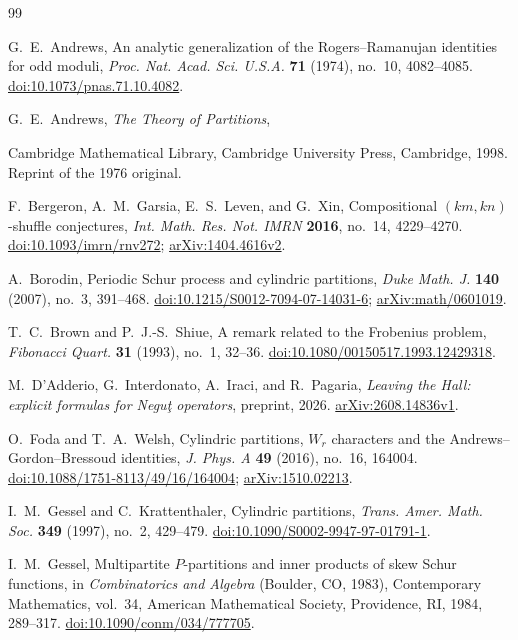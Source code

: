 \documentclass[12pt,reqno]{amsart}
\numberwithin{equation}{section}
\theoremstyle{definition}
\theoremstyle{remark}
\theoremstyle{plain}
\begin{document}
\begin{thebibliography}{99}
\raggedright

G.~E.~Andrews,
An analytic generalization of the Rogers--Ramanujan identities for odd moduli,
\emph{Proc. Nat. Acad. Sci. U.S.A.} \textbf{71} (1974), no.~10, 4082--4085.
\href{https://doi.org/10.1073/pnas.71.10.4082}{doi:10.1073/pnas.71.10.4082}.

G.~E.~Andrews,
\emph{The Theory of Partitions},

Cambridge Mathematical Library, Cambridge University Press, Cambridge, 1998.
Reprint of the 1976 original.


F.~Bergeron, A.~M.~Garsia, E.~S.~Leven, and G.~Xin,
Compositional $(km,kn)$-shuffle conjectures,
\emph{Int. Math. Res. Not. IMRN} \textbf{2016}, no.~14, 4229--4270.
\href{https://doi.org/10.1093/imrn/rnv272}{doi:10.1093/imrn/rnv272};
\href{https://arxiv.org/abs/1404.4616v2}{arXiv:1404.4616v2}.

A.~Borodin,
Periodic Schur process and cylindric partitions,
\emph{Duke Math. J.} \textbf{140} (2007), no.~3, 391--468.
\href{https://doi.org/10.1215/S0012-7094-07-14031-6}{doi:10.1215/S0012-7094-07-14031-6};
\href{https://arxiv.org/abs/math/0601019}{arXiv:math/0601019}.

T.~C.~Brown and P.~J.-S.~Shiue,
A remark related to the Frobenius problem,
\emph{Fibonacci Quart.} \textbf{31} (1993), no.~1, 32--36.
\href{https://doi.org/10.1080/00150517.1993.12429318}{doi:10.1080/00150517.1993.12429318}.


M.~D'Adderio, G.~Interdonato, A.~Iraci, and R.~Pagaria,
\emph{Leaving the Hall: explicit formulas for Negu\c{t} operators},
preprint, 2026.
\href{https://arxiv.org/abs/2608.14836v1}{arXiv:2608.14836v1}.


O.~Foda and T.~A.~Welsh,
Cylindric partitions, $W_r$ characters and the Andrews--Gordon--Bressoud identities,
\emph{J. Phys. A} \textbf{49} (2016), no.~16, 164004.
\href{https://doi.org/10.1088/1751-8113/49/16/164004}{doi:10.1088/1751-8113/49/16/164004};
\href{https://arxiv.org/abs/1510.02213}{arXiv:1510.02213}.

I.~M.~Gessel and C.~Krattenthaler,
Cylindric partitions,
\emph{Trans. Amer. Math. Soc.} \textbf{349} (1997), no.~2, 429--479.
\href{https://doi.org/10.1090/S0002-9947-97-01791-1}{doi:10.1090/S0002-9947-97-01791-1}.

I.~M.~Gessel,
Multipartite $P$-partitions and inner products of skew Schur functions,
in \emph{Combinatorics and Algebra} (Boulder, CO, 1983),
Contemporary Mathematics, vol.~34, American Mathematical Society,
Providence, RI, 1984, 289--317.
\href{https://doi.org/10.1090/conm/034/777705}{doi:10.1090/conm/034/777705}.



\end{thebibliography}
\end{document}
